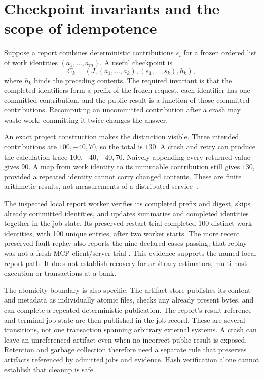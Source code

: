 \section{Checkpoint invariants and the scope of idempotence}

Suppose a report combines deterministic contributions $s_i$ for a frozen
ordered list of work identities $(a_1,\ldots,a_m)$. A useful checkpoint is
\[
 C_k=(J,(a_1,\ldots,a_k),(s_1,\ldots,s_k),h_k),
\]
where $h_k$ binds the preceding contents. The required invariant is that the
completed identifiers form a prefix of the frozen request, each identifier
has one committed contribution, and the public result is a function of those
committed contributions. Recomputing an uncommitted contribution after a
crash may waste work; committing it twice changes the answer.

An exact project construction makes the distinction visible. Three intended
contributions are $100,-40,70$, so the total is $130$. A crash and retry can
produce the calculation trace $100,-40,-40,70$. Naively appending every
returned value gives $90$. A map from work identity to its immutable
contribution still gives $130$, provided a repeated identity cannot carry
changed contents. These are finite arithmetic results, not measurements of
a distributed service~\citep{exec13_ops_exact}.

The inspected local report worker verifies its completed prefix and digest,
skips already committed identities, and updates summaries and completed
identities together in the job state. Its preserved restart trial completed
100 distinct work identities, with 100 unique entries, after two worker
starts. The more recent preserved fault replay also reports the nine declared
cases passing; that replay was not a fresh MCP client/server trial
\cite{exec13_ops_source,exec13_ops_faults}. This evidence supports the named
local report path. It does not establish recovery for arbitrary estimators,
multi-host execution or transactions at a bank.

The atomicity boundary is also specific. The artifact store publishes its
content and metadata as individually atomic files, checks any already
present bytes, and can complete a repeated deterministic publication. The
report's result reference and terminal job state are then published in the
job record. These are several transitions, not one transaction spanning
arbitrary external systems. A crash can leave an unreferenced artifact even
when no incorrect public result is exposed. Retention and garbage collection
therefore need a separate rule that preserves artifacts referenced by admitted
jobs and evidence. Hash verification alone cannot establish that cleanup is
safe.

